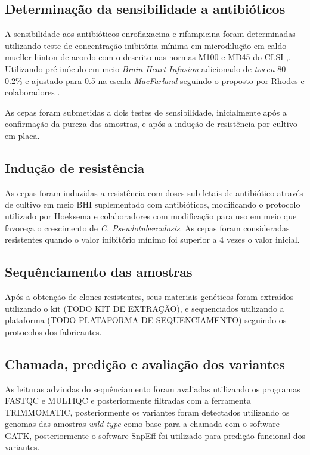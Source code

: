 \subsection{Determinação da sensibilidade a antibióticos}

A sensibilidade aos antibióticos enroflaxacina e rifampicina foram determinadas utilizando teste de concentração inibitória mínima em microdilução em 
caldo mueller hinton de acordo com o descrito nas
normas M100 e MD45 do CLSI \citeyear{clsi2015},\citeyear{clsi2020}. Utilizando pré inóculo em meio \textit{Brain Heart Infusion} adicionado de \textit{tween} 80 0.2\%
e ajustado para 0.5 na escala \textit{MacFarland} seguindo o proposto por Rhodes e colaboradores \citeyear{rhodes2015}. 

As cepas foram submetidas a dois testes de sensibilidade, inicialmente após a confirmação da pureza das amostras, e após a indução de resistência por cultivo em placa.


\subsection{Indução de resistência}

As cepas foram induzidas a resistência com doses sub-letais de antibiótico através de cultivo em meio BHI suplementado com antibióticos,
modificando o protocolo utilizado por Hoeksema e colaboradores \citeyear{hoeksema2019} com modificação para uso em meio que favoreça o crescimento de \textit{C. Pseudotuberculosis}. 
As cepas foram consideradas resistentes quando o valor inibitório mínimo foi superior a 4 vezes o valor inicial.


\subsection{Sequênciamento das amostras}

Após a obtenção de clones resistentes, seus materiais genéticos foram extraídos utilizando o kit (TODO KIT DE EXTRAÇÂO), e sequenciados utilizando a plataforma (TODO PLATAFORMA DE SEQUENCIAMENTO) seguindo os protocolos dos fabricantes.

\subsection{Chamada, predição e avaliação dos variantes}

As leituras advindas do sequênciamento foram avaliadas utilizando os programas FASTQC e MULTIQC e posteriormente filtradas com a ferramenta TRIMMOMATIC, posteriormente
os variantes foram detectados utilizando os genomas das amostras \textit{wild type} como base para a chamada com o software GATK, posteriormente o software SnpEff foi utilizado para predição funcional dos variantes. 

